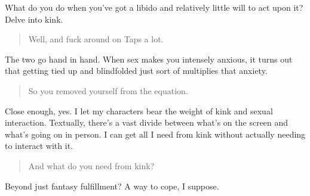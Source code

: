 What do you do when you've got a libido and relatively little will to act upon it? Delve into kink.

\begin{quote}
Well, and fuck around on Taps a lot.
\end{quote}

The two go hand in hand. When sex makes you intensely anxious, it turns out that getting tied up and blindfolded just sort of multiplies that anxiety.

\begin{quote}
So you removed yourself from the equation.
\end{quote}

Close enough, yes. I let my characters bear the weight of kink and sexual interaction. Textually, there's a vast divide between what's on the screen and what's going on in person. I can get all I need from kink without actually needing to interact with it.

\begin{quote}
And what do you need from kink?
\end{quote}

Beyond just fantasy fulfillment? A way to cope, I suppose.
